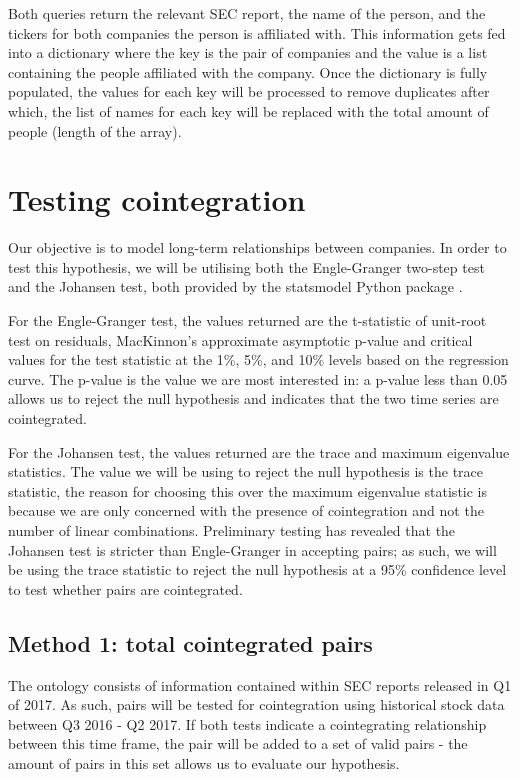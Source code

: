 \documentclass{UoYCSproject}
\begin{document}
Both queries return the relevant SEC report, the name of the person, and the tickers for both companies the person is affiliated with. This information gets fed into a dictionary where the key is the pair of companies and the value is a list containing the people affiliated with the company. Once the dictionary is fully populated, the values for each key will be processed to remove duplicates after which, the list of names for each key will be replaced with the total amount of people (length of the array).

\section{Testing cointegration}

Our objective is to model long-term relationships between companies. In order to test this hypothesis, we will be utilising both the Engle-Granger two-step test and the Johansen test, both provided by the statsmodel Python package \parencite{statsmodelenglegranger} \parencite{statsmodeljohansen}.

For the Engle-Granger test, the values returned are the t-statistic of unit-root test on residuals, MacKinnon’s approximate asymptotic p-value \parencite{mackinnon} and critical values for the test statistic at the 1\%, 5\%, and 10\% levels based on the regression curve. The p-value is the value we are most interested in: a p-value less than 0.05 allows us to reject the null hypothesis and indicates that the two time series are cointegrated.

For the Johansen test, the values returned are the trace and maximum eigenvalue statistics. The value we will be using to reject the null hypothesis is the trace statistic, the reason for choosing this over the maximum eigenvalue statistic is because we are only concerned with the presence of cointegration and not the number of linear combinations. Preliminary testing has revealed that the Johansen test is stricter than Engle-Granger in accepting pairs; as such, we will be using the trace statistic to reject the null hypothesis at a 95\% confidence level to test whether pairs are cointegrated.

\subsection{Method 1: total cointegrated pairs}

The ontology consists of information contained within SEC reports released in Q1 of 2017. As such, pairs will be tested for cointegration using historical stock data between Q3 2016 - Q2 2017. If both tests indicate a cointegrating relationship between this time frame, the pair will be added to a set of valid pairs - the amount of pairs in this set allows us to evaluate our hypothesis.
\end{document}
